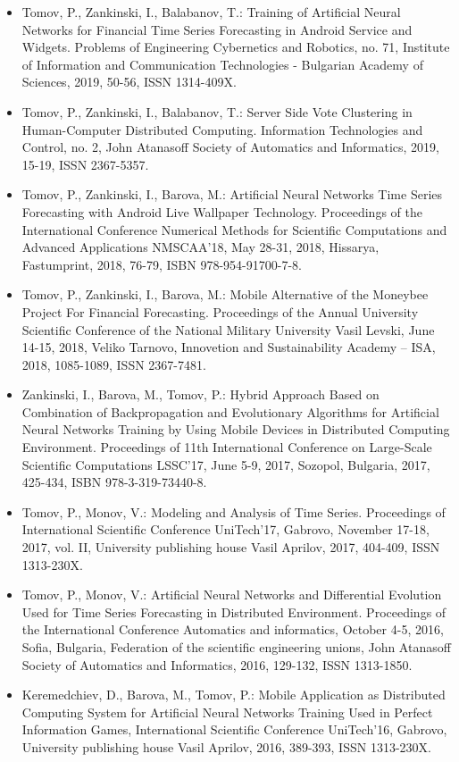\begin{itemize}
\item Tomov, P., Zankinski, I., Balabanov, T.: Training of Artificial Neural Networks for Financial Time Series Forecasting in Android Service and Widgets. Problems of Engineering Cybernetics and Robotics, no. 71, Institute of Information and Communication Technologies - Bulgarian Academy of Sciences, 2019, 50-56, ISSN 1314-409X.

\item Tomov, P., Zankinski, I., Balabanov, T.: Server Side Vote Clustering in Human-Computer Distributed Computing. Information Technologies and Control, no. 2, John Atanasoff Society of Automatics and Informatics, 2019, 15-19, ISSN 2367-5357.

\item Tomov, P., Zankinski, I., Barova, M.: Artificial Neural Networks Time Series Forecasting with Android Live Wallpaper Technology. Proceedings of the International Conference Numerical Methods for Scientific Computations and Advanced Applications NMSCAA’18, May 28-31, 2018, Hissarya, Fastumprint, 2018, 76-79,  ISBN 978-954-91700-7-8.

\item Tomov, P., Zankinski, I., Barova, M.: Mobile Alternative of the Moneybee Project For Financial Forecasting. Proceedings of the Annual University Scientific  Conference of the National Military University Vasil Levski, June 14-15, 2018, Veliko Tarnovo, Innovetion and Sustainability Academy – ISA, 2018, 1085-1089, ISSN 2367-7481.

\item Zankinski, I., Barova, M., Tomov, P.: Hybrid Approach Based on Combination of Backpropagation and Evolutionary Algorithms for Artificial Neural Networks Training by Using Mobile Devices in Distributed Computing Environment. Proceedings of 11th International Conference on Large-Scale Scientific Computations LSSC'17, June 5-9, 2017, Sozopol, Bulgaria, 2017, 425-434, ISBN 978-3-319-73440-8.

\item Tomov, P., Monov, V.: Modeling and Analysis of Time Series. Proceedings of International Scientific Conference UniTech’17, Gabrovo, November 17-18, 2017, vol. II, University publishing house Vasil Aprilov, 2017, 404-409, ISSN 1313-230X.

\item Tomov, P., Monov, V.: Artificial Neural Networks and Differential Evolution Used for Time Series Forecasting in Distributed Environment. Proceedings of the International Conference Automatics and informatics, October 4-5, 2016, Sofia, Bulgaria, Federation of the scientific engineering unions, John Atanasoff Society of Automatics and Informatics, 2016, 129-132, ISSN 1313-1850.

\item Keremedchiev, D., Barova, M., Tomov, P.: Mobile Application as Distributed Computing System for Artificial Neural Networks Training Used in Perfect Information Games, International Scientific Conference UniTech’16, Gabrovo, University publishing house Vasil Aprilov, 2016, 389-393, ISSN 1313-230X.
\end{itemize}

